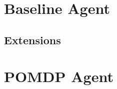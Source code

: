 \section{Baseline Agent}\label{sec:baseline}

\subsection{Extensions}
\section{POMDP Agent}\label{sec:POMDPagent}

